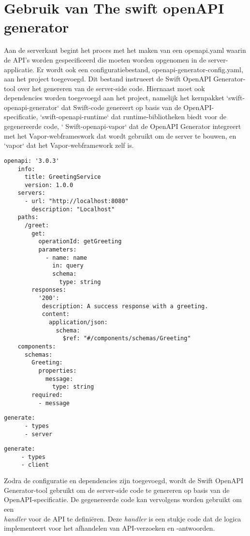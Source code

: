 \section{Gebruik van The swift openAPI generator}

Aan de serverkant begint het proces met het maken van een openapi.yaml waarin de API's worden gespecificeerd die moeten worden opgenomen in de server-\\applicatie. Er wordt ook een configuratiebestand, openapi-generator-config.yaml, aan het project toegevoegd. Dit bestand instrueert de Swift OpenAPI Generator-tool over het genereren van de server-side code. Hiernaast moet ook \\dependencies worden toegevoegd aan het project, namelijk het kernpakket `swift-openapi-generator` dat Swift-code genereert op basis van de OpenAPI-specificatie, `swift-openapi-runtime` dat runtime-bibliotheken biedt voor de gegenereerde code, ` Swift-openapi-vapor` dat de OpenAPI Generator integreert met het Vapor-webframeswork dat wordt gebruikt om de server te bouwen, en `vapor` dat het Vapor-webframework zelf is.

\begin{lstlisting}[caption=openapi.yml file]
    openapi: '3.0.3'
    info:
      title: GreetingService
      version: 1.0.0
    servers:
      - url: "http://localhost:8080"
        description: "Localhost"
    paths:
      /greet:
        get:
          operationId: getGreeting
          parameters:
            - name: name
              in: query
              schema:
                type: string
        responses:
          '200':
           description: A success response with a greeting.
           content:
             application/json:
               schema:
                 $ref: "#/components/schemas/Greeting"
    components:
      schemas:
        Greeting:
          properties:
            message:
              type: string
        required:
          - message
\end{lstlisting}

\begin{lstlisting}[caption=openapi-generator-config.yaml server file]
    generate:
      - types
      - server
\end{lstlisting}

\begin{lstlisting}[caption=openapi-generator-config.yaml client file]
   generate:
     - types
     - client
\end{lstlisting}

Zodra de configuratie en dependencies zijn toegevoegd, wordt de Swift OpenAPI Generator-tool gebruikt om de server-side code te genereren op basis van de OpenAPI-specificatie. De gegenereerde code kan vervolgens worden gebruikt om een \\ \textit{handler} voor de API te definiëren. Deze \textit{handler} is een stukje code dat de logica implementeert voor het afhandelen van API-verzoeken en -antwoorden. 

